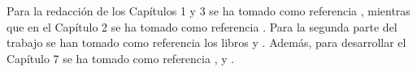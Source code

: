 \medskip 

Para la redacción de los Capítulos 1 y 3 se ha tomado como referencia \cite{libro_esfarm}, mientras que en el Capítulo 2 se ha tomado como referencia \cite{art_grad}. Para la segunda parte del trabajo se han tomado como referencia los libros \cite{data_mining} y \cite{clasification}. Además, para desarrollar el Capítulo 7 se ha tomado como referencia \cite{boosting}, \cite{rusboost} y \cite{cusboost}. 